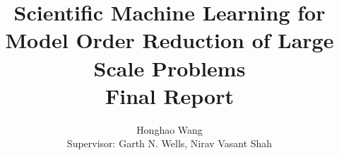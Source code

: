 \documentclass[12pt]{article}
\title{Scientific Machine Learning for Model Order Reduction of Large Scale Problems \\ \Large Final Report}
\author{Honghao Wang \\[0.5cm]{\Small Supervisor: Garth N. Wells, Nirav Vasant Shah}}
\begin{document}
\maketitle









\pagebreak


\end{document}
